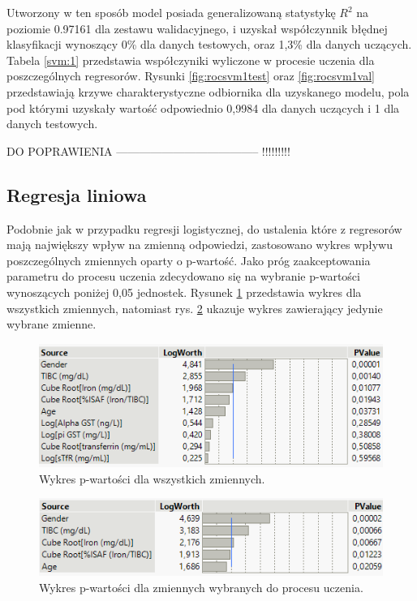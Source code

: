 Utworzony w ten sposób model posiada generalizowaną statystykę $R^{2}$ na poziomie 0.97161 dla zestawu walidacyjnego, i uzyskał współczynnik błędnej klasyfikacji wynoszący 0\% dla danych testowych, oraz 1,3\% dla danych uczących. Tabela \ref{svm:1} przedstawia współczyniki wyliczone w procesie uczenia dla poszczególnych regresorów. Rysunki \ref{fig:rocsvm1test} oraz \ref{fig:rocsvm1val} przedstawiają krzywe charakterystyczne odbiornika dla uzyskanego modelu, pola pod którymi uzyskały wartość odpowiednio 0,9984 dla danych uczących i 1 dla danych testowych.

DO POPRAWIENIA -------------------------------------- !!!!!!!!!

\subsection{Regresja liniowa}

Podobnie jak w przypadku regresji logistycznej, do ustalenia które z regresorów mają największy wpływ na zmienną odpowiedzi, zastosowano wykres wpływu poszczególnych zmiennych oparty o p-wartość. Jako próg zaakceptowania parametru do procesu uczenia zdecydowano się na wybranie p-wartości wynoszących poniżej 0,05 jednostek. Rysunek \ref{fig:pvalue3} przedstawia wykres dla wszystkich zmiennych, natomiast rys. \ref{fig:pvalue4} ukazuje wykres zawierający jedynie wybrane zmienne. 

\begin{figure}[!ht]
	\centering
	\includegraphics[width=0.7\linewidth]{Rozdzial3/pvalue3}
	\caption{Wykres p-wartości dla wszystkich zmiennych.}
	\label{fig:pvalue3}
\end{figure}

\begin{figure}[!ht]
	\centering
	\includegraphics[width=0.7\linewidth]{Rozdzial3/pvalue4}
	\caption{Wykres p-wartości dla zmiennych wybranych do procesu uczenia.}
	\label{fig:pvalue4}
\end{figure}


